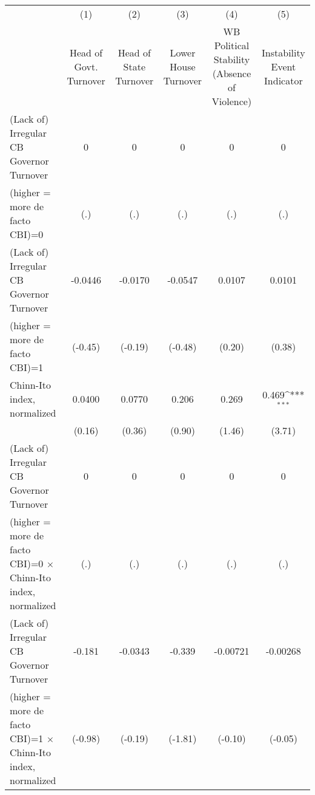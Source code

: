 \begin{table}[htbp]\centering
\def\sym#1{\ifmmode^{#1}\else\(^{#1}\)\fi}
\caption{\label{ikmultIndFEDF}}
\begin{tabular}{l*{5}{c}}
\toprule
                                        &\multicolumn{1}{c}{(1)}&\multicolumn{1}{c}{(2)}&\multicolumn{1}{c}{(3)}&\multicolumn{1}{c}{(4)}&\multicolumn{1}{c}{(5)}\\
                                        &\multicolumn{1}{c}{Head of Govt. Turnover}&\multicolumn{1}{c}{Head of State Turnover}&\multicolumn{1}{c}{Lower House Turnover}&\multicolumn{1}{c}{WB Political Stability (Absence of Violence)}&\multicolumn{1}{c}{Instability Event Indicator}\\
\midrule
(Lack of) Irregular CB Governor Turnover&        0         &        0         &        0         &        0         &        0         \\
(higher = more de facto CBI)=0          &      (.)         &      (.)         &      (.)         &      (.)         &      (.)         \\
\addlinespace
(Lack of) Irregular CB Governor Turnover&  -0.0446         &  -0.0170         &  -0.0547         &   0.0107         &   0.0101         \\
(higher = more de facto CBI)=1          &  (-0.45)         &  (-0.19)         &  (-0.48)         &   (0.20)         &   (0.38)         \\
\addlinespace
Chinn-Ito index, normalized             &   0.0400         &   0.0770         &    0.206         &    0.269         &    0.469\sym{***}\\
                                        &   (0.16)         &   (0.36)         &   (0.90)         &   (1.46)         &   (3.71)         \\
\addlinespace
(Lack of) Irregular CB Governor Turnover&        0         &        0         &        0         &        0         &        0         \\
(higher = more de facto CBI)=0 $\times$ Chinn-Ito index, normalized&      (.)         &      (.)         &      (.)         &      (.)         &      (.)         \\
\addlinespace
(Lack of) Irregular CB Governor Turnover&   -0.181         &  -0.0343         &   -0.339         & -0.00721         & -0.00268         \\
(higher = more de facto CBI)=1 $\times$ Chinn-Ito index, normalized&  (-0.98)         &  (-0.19)         &  (-1.81)         &  (-0.10)         &  (-0.05)         \\

\end{tabular}
\end{table}
